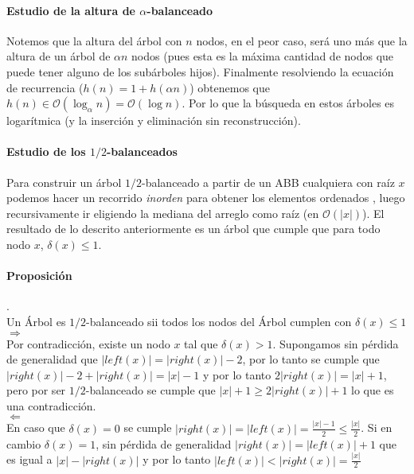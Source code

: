 \documentclass[dcc,uchile]{fcfmcourse}
\theoremstyle{plain}
\theoremstyle{definition}
\begin{document}
\begin{problems}
\paragraph{Estudio de la altura de $\alpha$-balanceado} Notemos que la altura del árbol con $n$ nodos, en el peor caso, será uno más que la altura de un árbol de $\alpha n$ nodos (pues esta es la máxima cantidad de nodos que puede tener alguno de los subárboles hijos). Finalmente resolviendo la ecuación de recurrencia ($h(n) = 1 + h(\alpha n)$) obtenemos que $h(n) \in \mathcal{O}(\log_\alpha n) = \mathcal{O}(\log n)$. Por lo que la búsqueda en estos árboles es logarítmica (y la inserción y eliminación sin reconstrucción).

\paragraph{Estudio de los $1/2$-balanceados} Para construir un árbol $1/2$-balanceado a partir de un ABB cualquiera con raíz $x$ podemos hacer un recorrido \textit{inorden} para obtener los elementos ordenados , luego recursivamente ir eligiendo la mediana del arreglo como raíz (en $\mathcal{O}(|x|)$). El resultado de lo descrito anteriormente es un árbol que cumple que para todo nodo $x$, $\delta(x)\le 1$.

\paragraph{Proposición}.
\\Un Árbol es $1/2$-balanceado sii todos los nodos del Árbol cumplen con $\delta(x)\le 1$\\

\underline{$\Rightarrow$}\\
Por contradicción, existe un nodo $x$ tal que $\delta(x)>1$. Supongamos sin pérdida de generalidad que $|left(x)| = |right(x)| - 2$, por lo tanto se cumple que $|right(x)| - 2 + |right(x)| = |x|-1$ y por lo tanto $2|right(x)| = |x|+1$, pero por ser $1/2$-balanceado se cumple que $|x|+1\ge 2|right(x)| + 1$ lo que es una contradicción.\\

\underline{$\Leftarrow$}\\
En caso que $\delta(x) = 0$ se cumple $|right(x)| = |left(x)| = \frac{|x|-1}{2} \le \frac{|x|}{2}$. Si en cambio $\delta(x) = 1$, sin pérdida de generalidad $|right(x)| = |left(x)| + 1$ que es igual a $|x| - |right(x)|$ y por lo tanto $|left(x)| < |right(x)| = \frac{|x|}{2}$
\end{problems}
 
\end{document}
